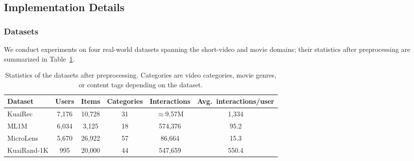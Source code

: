 \subsection{Implementation Details}

\subsubsection{Datasets}
\label{sec:datasets}
We conduct experiments on four real-world datasets spanning the short-video and movie domains; their statistics after preprocessing are summarized in Table~\ref{tab:dataset_stats}.

\begin{table}[t]
\centering
\small
\caption{Statistics of the datasets after preprocessing. Categories are video categories, movie genres, or content tags depending on the dataset.}
\label{tab:dataset_stats}
\begin{tabular}{lccccc}
\toprule
Dataset & Users & Items & Categories & Interactions & Avg.\ interactions/user \\
\midrule
KuaiRec     & 7,176 & 10,728 & 31 & $\approx$9.57M & 1,334 \\
ML1M        & 6,034 & 3,125  & 18 & 574,376        & 95.2 \\
MicroLens   & 5,670 & 26,922 & 57 & 86,664         & 15.3 \\
KuaiRand-1K & 995   & 20,000 & 44 & 547,659        & 550.4 \\
\bottomrule
\end{tabular}
\end{table}


